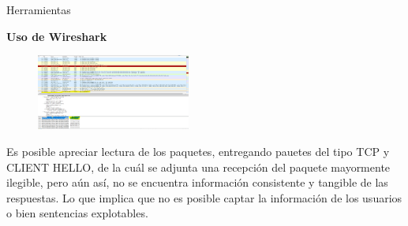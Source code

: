 \begin{frame}[t,fragile]{Herramientas}

\textbf{Uso de Wireshark}

\begin{figure} 
\vspace{2pt}
  \begin{center}
    \includegraphics[width=0.45\textwidth]{paquetelectura.png}
    \label{fig:databaseUserTable}
  \end{center}
  \vspace{2pt}
\end{figure} 

\bigskip

Es posible apreciar lectura de los paquetes, entregando pauetes del tipo TCP y CLIENT HELLO, de la cuál se adjunta una recepción del paquete mayormente ilegible, pero aún así, no se encuentra información consistente y tangible de las respuestas. Lo que implica que no es posible captar la información de los usuarios o bien sentencias explotables.


\end{frame}